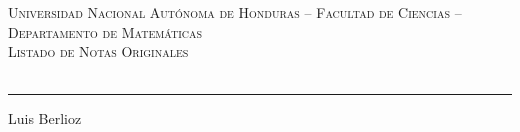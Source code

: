 \documentclass[letterpaper,landscape]{article}
\begin{document}
\begin{center}
\textsc{{\large Universidad Nacional Autónoma de Honduras -- Facultad de Ciencias -- Departamento de Matemáticas}\\ Listado de Notas Originales}
\end{center}
\begin{longtable}[c]{|c|c|l|l|l|l|c|c|c|c|c|c|c|c|c|c|}
\hline

\end{longtable}
\vspace{25pt}
\begin{flushright}
\begin{minipage}[b]{10cm}
\hrule
\vspace{3pt}
\begin{center} Luis Berlioz \end{center}
\end{minipage}
\end{flushright}
\end{document}
